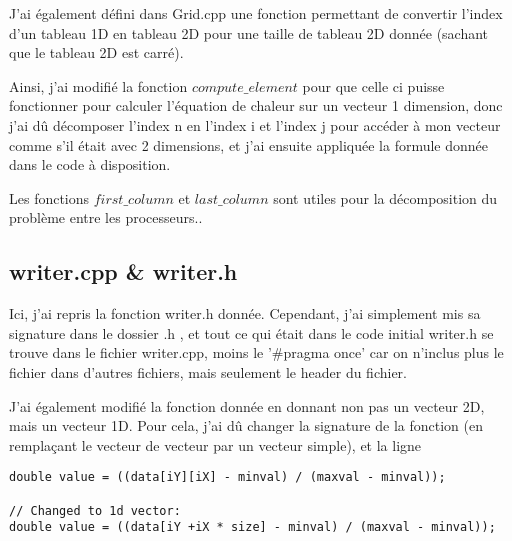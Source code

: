\documentclass[11pt]{article}
\begin{document}
J'ai également défini dans Grid.cpp une fonction permettant de convertir l'index d'un tableau 1D en
tableau 2D pour une taille de tableau 2D donnée (sachant que le tableau 2D est carré).

Ainsi, j'ai modifié la fonction \(compute\_element\) pour que celle ci puisse fonctionner pour calculer
l'équation de chaleur sur un vecteur 1 dimension, donc j'ai dû décomposer l'index n en l'index
i et l'index j pour accéder à mon vecteur comme s'il était avec 2 dimensions, et j'ai ensuite appliquée
la formule donnée dans le code à disposition.

Les fonctions \(first\_column\) et \(last\_column\) sont utiles pour la décomposition du problème entre les
processeurs..

\subsection{writer.cpp \& writer.h}
\label{sec:org7de9e8f}

Ici, j'ai repris la fonction writer.h donnée. Cependant, j'ai simplement mis sa signature dans le dossier
.h , et tout ce qui était dans le code initial writer.h se trouve dans le fichier writer.cpp, moins le
'\#pragma once' car on n'inclus plus le fichier dans d'autres fichiers, mais seulement le header du fichier.

J'ai également modifié la fonction donnée en donnant non pas un vecteur 2D, mais un vecteur 1D. Pour cela,
j'ai dû changer la signature de la fonction (en remplaçant le vecteur de vecteur par un vecteur simple), et
la ligne
\begin{verbatim}
double value = ((data[iY][iX] - minval) / (maxval - minval));

// Changed to 1d vector:
double value = ((data[iY +iX * size] - minval) / (maxval - minval));
\end{verbatim}
\end{document}
